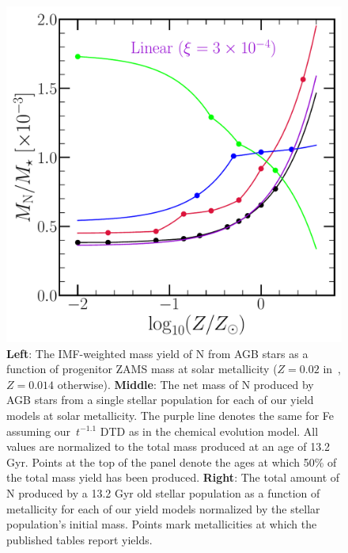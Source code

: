 \documentclass[ms.tex]{subfiles}
\begin{document}
\begin{figure}
\includegraphics[scale = 0.32]{ssp_production_metdep.pdf}
\caption{
\textbf{Left}: The IMF-weighted mass yield of N from AGB stars as a function of
progenitor ZAMS mass at solar metallicity ($Z = 0.02$ in~\karakasten,
$Z = 0.014$ otherwise).
\textbf{Middle}: The net mass of N produced by AGB stars from a single stellar
population for each of our yield models at solar metallicity.
The purple line denotes the same for Fe assuming our~$t^{-1.1}$ DTD as in the
\citet{Johnson2021} chemical evolution model.
All values are normalized to the total mass produced at an age of 13.2 Gyr.
Points at the top of the panel denote the ages at which 50\% of the total mass
yield has been produced.
\textbf{Right}: The total amount of N produced by a 13.2 Gyr old stellar
population as a function of metallicity for each of our yield models normalized
by the stellar population's initial mass.
Points mark metallicities at which the published tables report yields.
}
\label{fig:ssp}
\end{figure}
\end{document}
